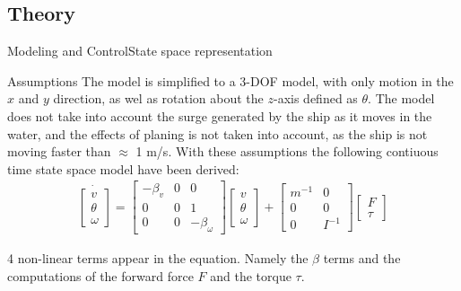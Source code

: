 \documentclass[10pt]{beamer}
\begin{document}
\subsection{Theory}
\begin{frame}{Modeling and Control}{State space representation}
  \begin{block}{Assumptions}
    The model is simplified to a 3-DOF model, with only motion in the $x$ and $y$ direction, as wel as rotation about the $z$-axis defined as $\theta$. The model does not take into account the surge generated by the ship as it moves in the water, and the effects of planing is not taken into account, as the ship is not moving faster than $\approx$ 1 m/s.
    With these assumptions the following contiuous time state space model have been derived:
  \begin{align}
  \dot{\begin{bmatrix}
v\\
\theta\\
\omega
\end{bmatrix}} = \begin{bmatrix}
-\beta_v & 0 & 0\\
0 & 0 & 1\\
0 & 0 & -\beta_\omega
\end{bmatrix} \begin{bmatrix}
v\\
\theta\\
\omega
\end{bmatrix} + \begin{bmatrix}
m^{-1} & 0\\
0 & 0\\
0 & I^{-1}
\end{bmatrix}\begin{bmatrix}
F\\
\tau
\end{bmatrix}
  \end{align}
    \end{block}
    4 non-linear terms appear in the equation. Namely the $\beta$ terms and the computations of the forward force $F$ and the torque $\tau$.
\end{frame}
\end{document}
